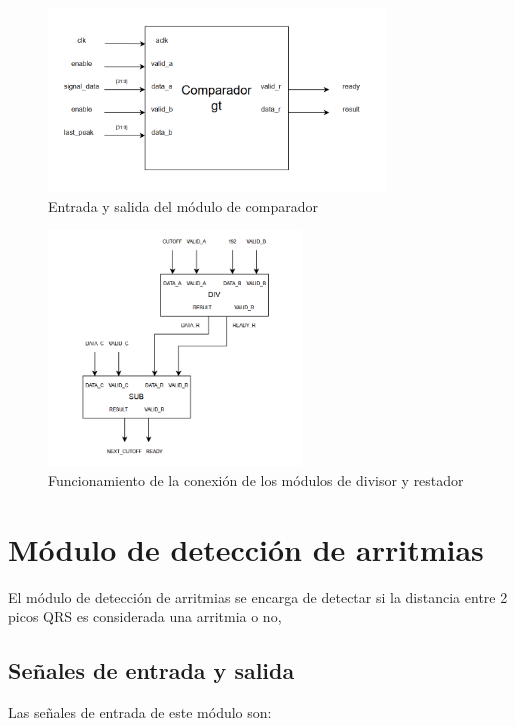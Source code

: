 \begin{figure}[h!]
    \centering
    \includegraphics[width=0.8\textwidth]{./Images/img_implementacion_hw/comparadorgt.png}
    \caption{Entrada y salida del módulo de comparador}
    \label{fig:comparadorgt}
\end{figure}

\begin{figure}[h!]
    \centering
    \includegraphics[width=0.6\textwidth]{./Images/img_implementacion_hw/DiagramaDivisorrestador.png}
    \caption{Funcionamiento de la conexión de los módulos de divisor y restador}
    \label{fig:divisorrestador}
\end{figure}

\section{Módulo de detección de arritmias}

El módulo de detección de arritmias se encarga de detectar si la distancia entre 2 picos QRS es considerada una arritmia o no,
 
\subsection{Señales de entrada y salida}
Las señales de entrada de este módulo son:

